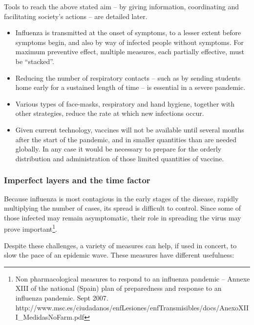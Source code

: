 \documentclass[12pt, a4]{scrartcl}
\begin{document}
Tools to reach the above stated aim – by giving information, coordinating and facilitating society's actions – are detailed later.

\begin{mdframed}[leftmargin=10pt,rightmargin=10pt]
\begin{itemize}
	\item Influenza is transmitted at the onset of symptoms, to a lesser extent before symptoms begin, and also by way of infected people without symptoms. For maximum preventive effect, multiple measures, each partially effective, must be “stacked”.
	\item Reducing the number of respiratory contacts – such as by sending students home early for a sustained length of time – is essential in a severe pandemic.
	\item Various types of face-masks, respiratory and hand hygiene, together with other strategies, reduce the rate at which new infections occur.
	\item Given current technology, vaccines will not be available until several months after the start of the pandemic, and in smaller quantities than are needed globally. In any case it would be necessary to prepare for the orderly distribution and administration of those limited quantities of vaccine.
\end{itemize}
\end{mdframed}

\subsubsection{Imperfect layers and the time factor}
Because influenza is most contagious in the early stages of the disease, rapidly multiplying the number of cases, its spread is difficult to control. Since some of those infected may remain asymptomatic, their role in spreading the virus may prove important\footnote{Non pharmacological measures to respond to an influenza pandemic – Annexe XIII of the national (Spain) plan of preparedness and response to an influenza pandemic. Sept 2007. http://www.msc.es/ciudadanos/enfLesiones/enfTransmisibles/docs/AnexoXIII_MedidasNoFarm.pdf}.

Despite these challenges, a variety of measures can help, if used in concert, to slow the pace of an epidemic wave. These measures have different usefulness:
\end{document}
